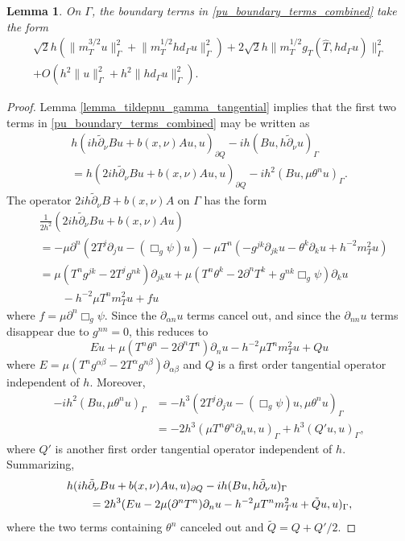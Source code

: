 \documentclass[11pt,letterpaper]{amsart}
\newtheorem{Lemma}[Theorem]{Lemma}
\theoremstyle{definition}
\numberwithin{equation}{section}
\newcommand{\norm}[1]{\lVert #1 \rVert}         %
\newcommand{\p}{\partial}
\def\p{\partial}
\begin{document}
\begin{Lemma} \label{lemma_pu_gamma_terms}
On $\Gamma$, the boundary terms in  \eqref{pu_boundary_terms_combined} take the form 
\begin{multline} \label{pu_gamma_terms}
\sqrt{2} h (\norm{m_T^{3/2} u}_{\Gamma}^2 + \norm{m_T^{1/2} h d_{\Gamma} u}_{\Gamma}^2) + 2 \sqrt{2} h \norm{m_T^{1/2} g_T(\hat{T}, hd_{\Gamma} u)}_{\Gamma}^2 \\
 + O(h^2 \norm{u}_{\Gamma}^2 + h^2 \norm{hd_{\Gamma} u}_{\Gamma}^2).
\end{multline}
\end{Lemma}
\begin{proof}
Lemma \ref{lemma_tildepnu_gamma_tangential} implies that the first two terms in \eqref{pu_boundary_terms_combined} may be written as 
\begin{multline*}
h (i h\tilde{\p}_{\nu} Bu + b(x,\nu) Au, u)_{\p Q}  -ih(Bu, h \tilde{\p}_{\nu} u)_{\Gamma} \\
 = h (2 i h\tilde{\p}_{\nu} Bu + b(x,\nu) Au, u)_{\p Q}  - ih^2 (Bu, \mu \theta^n u)_{\Gamma}.
\end{multline*}
The operator $2 ih \tilde{\p}_{\nu} B + b(x,\nu) A$ on $\Gamma$ has the form  
\begin{align*}
 &\frac{1}{2 h^2} (2 ih \tilde{\p}_{\nu} B u + b(x,\nu) A u)  \\
 &= -\mu \p^n(2 T^j \p_j u -  (\Box_g \psi) u) - \mu T^n(-g^{jk} \p_{jk} u - \theta^k \p_k u + h^{-2} m_T^2 u)  \\
 &= \mu (T^n g^{jk} - 2 T^j g^{nk}) \p_{jk} u + \mu (T^n \theta^k  - 2 \p^n T^k + g^{nk} \Box_g \psi)\p_k u  \\
 & \qquad -h^{-2} \mu T^n m_T^2 u + fu
\end{align*}
where $f = \mu \p^n \Box_g \psi$. Since the $\p_{\alpha n} u$ terms cancel out, and since the $\p_{nn} u$ terms disappear due to $g^{nn} = 0$, this reduces to 
\[
E u + \mu (T^n \theta^n - 2 \p^n T^n) \p_n u - h^{-2} \mu T^n m_T^2 u + Q u
\]
where $E = \mu (T^n g^{\alpha \beta} - 2 T^{\alpha} g^{n\beta}) \p_{\alpha \beta}$ and $Q$ is a first order tangential operator independent of $h$. 
Moreover, 
    \begin{align*}
- ih^2 (Bu, \mu \theta^n u)_{\Gamma}
&= -h^3(2 T^j \p_j u - (\Box_g \psi) u, \mu \theta^n u)_{\Gamma}
\\&= -2h^3(\mu T^n \theta^n \p_n u, u)_{\Gamma} + h^3(Q' u, u)_\Gamma,
    \end{align*}
where $Q'$ is another first order tangential operator independent of $h$. Summarizing,
\begin{align} \label{pu_bt_gamma_intermediate}
&h (i h\tilde{\p}_{\nu} Bu + b(x,\nu) Au, u)_{\p Q}  -ih(Bu, h \tilde{\p}_{\nu} u)_{\Gamma}
\\\notag&\qquad= 2h^3 (Eu - 2 \mu (\p^n T^n) \p_n u - h^{-2} \mu T^n m_T^2 u + \tilde{Q} u, u)_{\Gamma},
\end{align}
where the two terms containing $\theta^n$ canceled out and $\tilde Q = Q + Q'/2$.


\end{proof}
\end{document}
